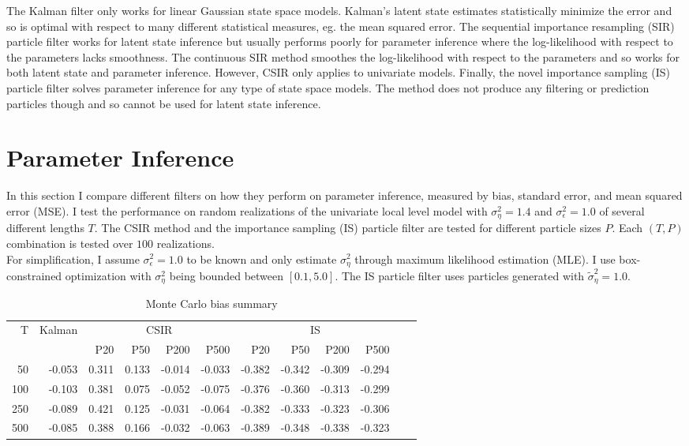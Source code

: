 \documentclass[11pt, oneside]{scrreprt}   	%
\begin{document}
The Kalman filter only works for linear Gaussian state space models. Kalman's latent state estimates statistically minimize the error and so is optimal with respect to many different statistical measures, eg. the mean squared error.  The sequential importance resampling (SIR) particle filter works for latent state inference but usually performs poorly for parameter inference where the log-likelihood with respect to the parameters lacks smoothness. The continuous SIR method smoothes the log-likelihood with respect to the parameters and so works for both latent state and parameter inference. However, CSIR only applies to univariate models. Finally, the novel importance sampling (IS) particle filter solves parameter inference for any type of state space models. The method does not produce any filtering or prediction particles though and so cannot be used for latent state inference. 


\section{Parameter Inference}
In this section I compare different filters on how they perform on parameter inference, measured by bias, standard error, and mean squared error (MSE). I test the performance on random realizations of the univariate local level model with $\sigma_{\eta}^2=1.4$ and $\sigma_{\epsilon}^2=1.0$ of several different lengths $T$. The CSIR method and the importance sampling (IS) particle filter are tested for different particle sizes $P$. Each $(T, P)$ combination is tested over $100$ realizations.\\

For simplification, I assume $\sigma_{\epsilon}^2=1.0$ to be known and only estimate $\sigma_{\eta}^2$ through maximum likelihood estimation (MLE). I use box-constrained optimization with $\sigma_{\eta}^2$ being bounded between $[0.1, 5.0]$. The IS particle filter uses particles generated with $\tilde{\sigma}_{\eta}^2=1.0$.


\begin{table}[h!]
\centering
\begin{tabular}{rrrrrrrrrrrr}
\hline
T  & Kalman &  \multicolumn{4}{c}{CSIR} &  \multicolumn{4}{c}{IS}\\
\cline{3-10}
& & P20 & P50 & P200 & P500 & P20 & P50 & P200 & P500\\
\hline
50        & -0.053 & 0.311 & 0.133 & -0.014 & -0.033 & -0.382 & -0.342 & -0.309 & -0.294\\
100      & -0.103 & 0.381 & 0.075 & -0.052 & -0.075 & -0.376 & -0.360 & -0.313 & -0.299\\
250      & -0.089 & 0.421 & 0.125 & -0.031 & -0.064 & -0.382 & -0.333 & -0.323 & -0.306\\
500      & -0.085 & 0.388 & 0.166 & -0.032 & -0.063 & -0.389 & -0.348 & -0.338 & -0.323\\
\hline
\end{tabular}
\caption{Monte Carlo bias summary}
\label{tab:param_inference_bias}
\end{table}
\end{document}
